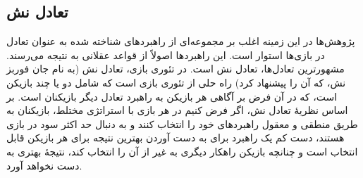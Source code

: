 \subsection{تعادل نش}
پژوهش‌ها در این زمینه اغلب بر مجموعه‌ای از راهبردهای شناخته شده به عنوان تعادل در بازی‌ها استوار است. این راهبردها اصولاً از قواعد عقلانی به نتیجه می‌رسند. مشهورترین تعادل‌ها، تعادل نش است. در تئوری بازی، تعادل نش (به نام جان فوربز نش، که آن را پیشنهاد کرد) راه حلی از تئوری بازی است که شامل دو یا چند بازیکن است، که در آن فرض بر آگاهی هر بازیکن به راهبرد تعادل دیگر بازیکنان است. بر اساس نظریهٔ تعادل نش، اگر فرض کنیم در هر بازی با استراتژی مختلط، بازیکنان به طریق منطقی و معقول راهبردهای خود را انتخاب کنند و به دنبال حد اکثر سود در بازی هستند، دست کم یک راهبرد برای به دست آوردن بهترین نتیجه برای هر بازیکن قابل انتخاب است و چنانچه بازیکن راهکار دیگری به غیر از آن را انتخاب کند، نتیجهٔ بهتری به دست نخواهد آورد.



